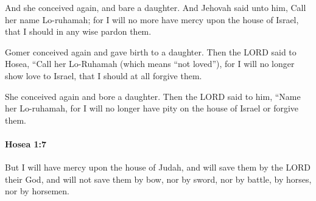 			\begin{versebox}
					\item[BHS] 
					\item[LXX] 
					\item[ASV] And she conceived again, and bare a daughter. And Jehovah said unto him, Call her name Lo-ruhamah; for I will no more have mercy upon the house of Israel, that I should in any wise pardon them.
					\item[NIV] Gomer conceived again and gave birth to a daughter. Then the LORD said to Hosea, “Call her Lo-Ruhamah (which means “not loved”), for I will no longer show love to Israel, that I should at all forgive them.
					\item[NRSV] She conceived again and bore a daughter. Then the LORD said to him, “Name her Lo-ruhamah, for I will no longer have pity on the house of Israel or forgive them.
			\end{versebox}

		\paragraph{Hosea 1:7} %
			\label{HOSEA-1-7}

			But I will have mercy upon the house of Judah, and will save them by the LORD their God, and will not save them by bow, nor by sword, nor by battle, by horses, nor by horsemen.

